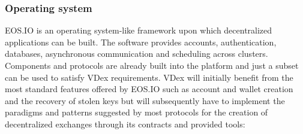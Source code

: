 \documentclass[]{article}
\begin{document}
	\subsubsection{Operating system}
	EOS.IO is an operating system-like framework upon which decentralized applications can be built. The software provides accounts, authentication, databases, asynchronous communication and scheduling across clusters. 
	Components and protocols are already built into the platform and just a subset can be used to satisfy VDex requirements.
	VDex will initially benefit from the most standard features offered by EOS.IO such as account and wallet creation and the recovery of stolen keys but will subsequently have to implement the paradigms and patterns suggested by most protocols for the creation of decentralized exchanges through its contracts and provided tools:	\cite{3}\\
  
\end{document}
